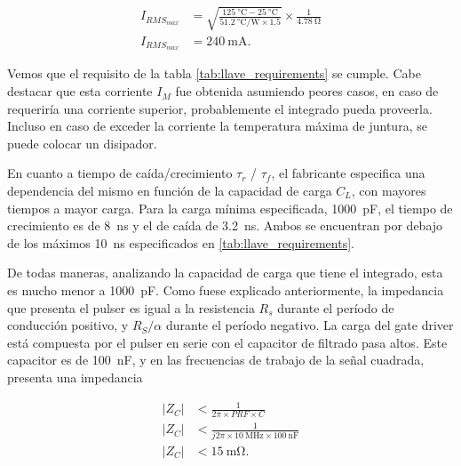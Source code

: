 \begin{equation}
    \begin{aligned}
        I_{RMS_{max}} &= \sqrt{\frac{ \qty{125}{\celsius}-
        \qty{25}{\celsius}}{\qty[per-mode=fraction]{51.2}{\celsius\per\watt}
        \times 1.5 }} \times \frac{1}{ \qty{4.78}{\ohm} } \\
        I_{RMS_{max}} &= \qty{240}{\milli\ampere}.
    \end{aligned}
\end{equation}

Vemos que el requisito de la tabla \ref{tab:llave_requirements} se cumple. Cabe
destacar que esta corriente $I_M$ fue obtenida asumiendo peores casos, en caso
de requeriría una corriente superior, probablemente el integrado pueda
proveerla. Incluso en caso de exceder la corriente la temperatura máxima de
juntura, se puede colocar un disipador.

En cuanto a tiempo de caída/crecimiento $\tau_{r}$ / $\tau_{f}$, el fabricante
especifica una dependencia del mismo en función de la capacidad de carga $C_L$,
con mayores tiempos a mayor carga. Para la carga mínima especificada,
\qty{1000}{\pico\farad}, el tiempo de crecimiento es de \qty{8}{\nano\second} y
el de caída de \qty{3.2}{\nano\second}. Ambos se encuentran por debajo de los
máximos \qty{10}{\nano\second} especificados en \ref{tab:llave_requirements}.

De todas maneras, analizando la capacidad de carga que tiene el integrado, esta
es mucho menor a \qty{1000}{\pico\farad}. Como fuese explicado anteriormente, la
impedancia que presenta el pulser es igual a la resistencia $R_s$ durante el
período de conducción positivo, y $R_S/\alpha$ durante el período negativo. La
carga del gate driver está compuesta por el pulser en serie con el capacitor de
filtrado pasa altos. Este capacitor es de \qty{100}{\nano\farad}, y en las
frecuencias de trabajo de la señal cuadrada, presenta una impedancia

\begin{equation}
    \begin{aligned}
        | Z_C | &< \frac{1}{2\pi \times PRF \times C} \\
        | Z_C | &< \frac{1}{j2\pi \times \qty{10}{\mega\hertz} \times
        \qty{100}{\nano\farad}} \\
        | Z_C | &< \qty{15}{\milli\ohm}. \\
    \end{aligned}
\end{equation}

